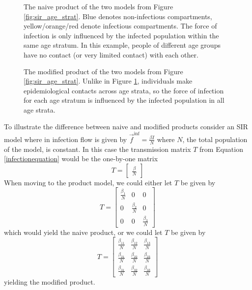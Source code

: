 \documentclass[pdflatex,sn-basic]{sn-jnl}%
\theoremstyle{definition}
\newcommand{\fvec}{\vec{f}}
\begin{document}
\begin{figure}
    \centering
    
    \caption{The naive product of the two models from Figure \ref{fig:sir_age_strat}. Blue denotes non-infectious compartments, yellow/orange/red denote infectious compartments. The force of infection is only influenced by the infected population within the same age stratum. In this example, people of different age groups have no contact (or very limited contact) with each other.}
    \label{fig:naive_product}
\end{figure}

\begin{figure}
    \centering
    
    \caption{The modified product of the two models from Figure \ref{fig:sir_age_strat}. Unlike in Figure \ref{fig:naive_product}, individuals make epidemiological contacts across age strata, so the force of infection for each age stratum is influenced by the infected population in all age strata.}
    \label{fig:modified_product}
\end{figure}

\FloatBarrier


To illustrate the difference between naive and modified products consider an SIR model where in infection flow is given by $\fvec^\text{inf} = \frac{\beta I}{N}$ where $N$, the total population of the model, is constant. In this case the transmission matrix $T$ from Equation \ref{infectionequation} would be the one-by-one matrix 
\[
    T = \begin{bmatrix} \frac{\beta}{N} \end{bmatrix}
\]
When moving to the product model, we could either let $T$ be given by
\[
    T = \begin{bmatrix}
        \frac{\beta_1}{N} & 0 & 0 \\
        0 & \frac{\beta_2}{N} & 0\\
        0 & 0 & \frac{\beta_3}{N}
    \end{bmatrix}
\]
which would yield the naive product, or we could let $T$ be given by
\[
    T = \begin{bmatrix}
        \frac{\beta_{11}}{N} & \frac{\beta_{12}}{N} & \frac{\beta_{13}}{N} \\
        \frac{\beta_{21}}{N} & \frac{\beta_{22}}{N} & \frac{\beta_{23}}{N}\\
        \frac{\beta_{31}}{N} & \frac{\beta_{32}}{N} & \frac{\beta_{33}}{N}
    \end{bmatrix}
\]
yielding the modified product.
\end{document}
